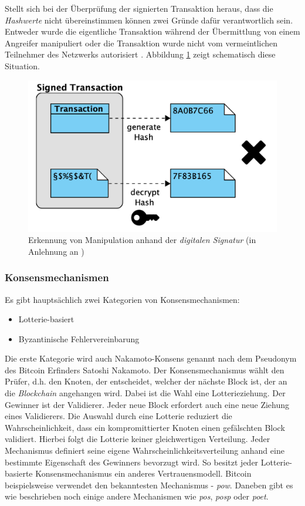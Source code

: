 Stellt sich bei der Überprüfung der signierten Transaktion heraus, dass die \textit{Hashwerte} nicht übereinstimmen können zwei Gründe dafür verantwortlich sein. Entweder wurde die eigentliche Transaktion während der Übermittlung von einem Angreifer manipuliert oder die Transaktion wurde nicht vom vermeintlichen Teilnehmer des Netzwerks autorisiert \citep{Drescher2017}. Abbildung \ref{fig:digital-signatures-validate-negative} zeigt schematisch diese Situation.

\begin{figure}[H]
	\centering
	\includegraphics[width=0.8\linewidth]{pictures/digital-signatures-validate-negative}
	\caption[Manipulationerkennung durch \textit{digitale Signaturen}]{Erkennung von Manipulation anhand der \textit{digitalen Signatur} (in Anlehnung an \citet{Drescher2017})}
	\label{fig:digital-signatures-validate-negative}
\end{figure}

\subsubsection{Konsensmechanismen}
Es gibt hauptsächlich zwei Kategorien von Konsensmechanismen:

\begin{itemize}
	\item Lotterie-basiert
	\item Byzantinische Fehlervereinbarung
\end{itemize}

\noindent
Die erste Kategorie wird auch Nakamoto-Konsens genannt nach dem Pseudonym des Bitcoin Erfinders Satoshi Nakamoto. Der Konsensmechanismus wählt den Prüfer, d.h. den Knoten, der entscheidet, welcher der nächste Block ist, der an die \textit{Blockchain} angehangen wird. Dabei ist die Wahl eine Lotterieziehung. Der Gewinner ist der Validierer. Jeder neue Block erfordert auch eine neue Ziehung eines Validierers. Die Auswahl durch eine Lotterie reduziert die Wahrscheinlichkeit, dass ein kompromittierter Knoten einen gefälschten Block validiert. Hierbei folgt die Lotterie keiner gleichwertigen Verteilung. Jeder Mechanismus definiert seine eigene Wahrscheinlichkeitsverteilung anhand eine bestimmte Eigenschaft des Gewinners bevorzugt wird. So besitzt jeder Lotterie-basierte Konsensmechanismus ein anderes Vertrauensmodell. Bitcoin beispielsweise verwendet den bekanntesten Mechanismus - \textit{\acf{pow}}. Daneben gibt es wie beschrieben noch einige andere Mechanismen wie \textit{\acf{pos}}, \textit{\acf{posp}} oder \textit{\acf{poet}}.


